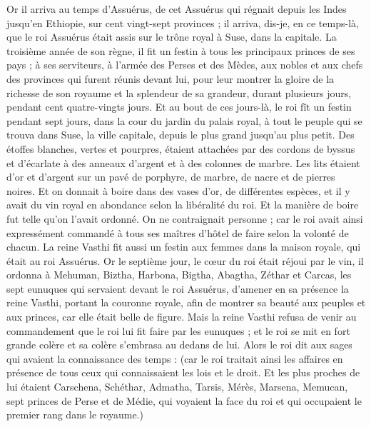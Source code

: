 \begin{multicols}{2}
\VerseOne{}Or il arriva au temps d'Assuérus, de cet Assuérus qui régnait depuis les Indes jusqu'en Ethiopie, sur cent vingt-sept provinces ;
il arriva, dis-je, en ce temps-là, que le roi Assuérus était assis sur le trône royal à Suse, dans la capitale.
La troisième année de son règne, il fit un festin à tous les principaux princes de ses pays ; à ses serviteurs, à l'armée des Perses et des Mèdes, aux nobles et aux chefs des provinces qui furent réunis devant lui,
pour leur montrer la gloire de la richesse de son royaume et la splendeur de sa grandeur, durant plusieurs jours, pendant cent quatre-vingts jours.
Et au bout de ces jours-là, le roi fît un festin pendant sept jours, dans la cour du jardin du palais royal, à tout le peuple qui se trouva dans Suse, la ville capitale, depuis le plus grand jusqu'au plus petit.
Des étoffes blanches, vertes et pourpres, étaient attachées par des cordons de byssus et d'écarlate à des anneaux d'argent et à des colonnes de marbre. Les lits étaient d'or et d'argent sur un pavé de porphyre, de marbre, de nacre et de pierres noires.
Et on donnait à boire dans des vases d'or, de différentes espèces, et il y avait du vin royal en abondance selon la libéralité du roi.
Et la manière de boire fut telle qu'on l'avait ordonné. On ne contraignait personne ; car le roi avait ainsi expressément commandé à tous ses maîtres d'hôtel de faire selon la volonté de chacun.
La reine Vasthi fit aussi un festin aux femmes dans la maison royale, qui était au roi Assuérus.
Or le septième jour, le cœur du roi était réjoui par le vin, il ordonna à Mehuman, Biztha, Harbona, Bigtha, Abagtha, Zéthar et Carcas, les sept eunuques qui servaient devant le roi Assuérus,
d'amener en sa présence la reine Vasthi, portant la couronne royale, afin de montrer sa beauté aux peuples et aux princes, car elle était belle de figure.
Mais la reine Vasthi refusa de venir au commandement que le roi lui fit faire par les eunuques ; et le roi se mit en fort grande colère et sa colère s'embrasa au dedans de lui.
Alors le roi dit aux sages qui avaient la connaissance des temps : (car le roi traitait ainsi les affaires en présence de tous ceux qui connaissaient les lois et le droit.
Et les plus proches de lui étaient Carschena, Schéthar, Admatha, Tarsis, Mérès, Marsena, Memucan, sept princes de Perse et de Médie, qui voyaient la face du roi et qui occupaient le premier rang dans le royaume.)

\end{multicols}
